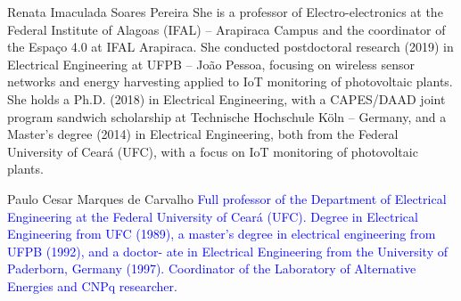 \documentclass{ieeeaccess}
\begin{document}
\begin{IEEEbiography}{Renata Imaculada Soares Pereira} 
She is a professor of Electro-electronics at the Federal Institute of Alagoas (IFAL) – Arapiraca Campus and the coordinator of the Espaço 4.0 at IFAL Arapiraca. She conducted postdoctoral research (2019) in Electrical Engineering at UFPB – João Pessoa, focusing on wireless sensor networks and energy harvesting applied to IoT monitoring of photovoltaic plants. She holds a Ph.D. (2018) in Electrical Engineering, with a CAPES/DAAD joint program sandwich scholarship at Technische Hochschule Köln – Germany, and a Master's degree (2014) in Electrical Engineering, both from the Federal University of Ceará (UFC), with a focus on IoT monitoring of photovoltaic plants.
\end{IEEEbiography}



\begin{IEEEbiography}{Paulo Cesar Marques de Carvalho}
\textcolor{blue}{
Full professor of the Department of Electrical Engineering at the Federal University of Ceará (UFC). Degree in Electrical Engineering from UFC (1989), a master’s degree in electrical engineering from UFPB (1992), and a doctor- ate in Electrical Engineering from the University of Paderborn, Germany (1997). Coordinator of the Laboratory of Alternative Energies and CNPq researcher.
}

\end{IEEEbiography}

\EOD
\end{document}
